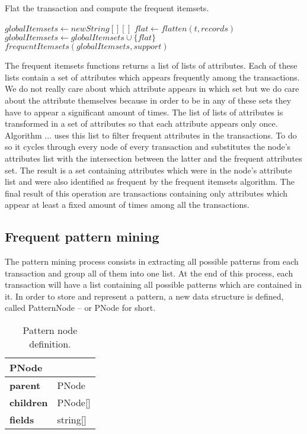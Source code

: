 \documentclass{acm_proc_article-sp-sigmod09}
\begin{document}
\begin{algorithm}
\caption{Flat the transaction and compute the frequent itemsets.}
\label{freqitemset}
\begin{algorithmic}[1]
\State $globalItemsets \gets new String[][]$
	\State $flat \gets flatten(t, records)$
	\State $globalItemsets \gets globalItemsets \cup \{flat\}$
\EndFor
\Return $frequentItemsets(globalItemsets, support)$
\EndFunction
\end{algorithmic}
\end{algorithm}

The frequent itemsets functions returns a list of lists of attributes. Each of these lists contain a set of attributes which appears frequently among the transactions. We do not really care about which attribute appears in which set but we do care about the attribute themselves because in order to be in any of these sets they have to appear a significant amount of times. The list of lists of attributes is transformed in a set of attributes so that each attribute appears only once. Algorithm ... uses this list to filter frequent attributes in the transactions. To do so it cycles through every node of every transaction and substitutes the node's attributes list with the intersection between the latter and the frequent attributes set. The result is a set containing attributes which were in the node's attribute list and were also identified as frequent by the frequent itemsets algorithm. The final result of this operation are transactions containing only attributes which appear at least a fixed amount of times among all the transactions.

\subsection{Frequent pattern mining}
\label{sec:patternmining}

The pattern mining process consists in extracting all possible patterns from each transaction and group all of them into one list. At the end of this process, each transaction will have a list containing all possible patterns which are contained in it. In order to store and represent a pattern, a new data structure is defined, called PatternNode -- or PNode for short.

\begin{table}[H]
\centering
\begin{tabular}{|ll|} \hline
\textbf{PNode} & \\ \hline
\textbf{parent} & PNode \\ \hline
\textbf{children} & PNode[] \\ \hline
\textbf{fields} & string[] \\
\hline\end{tabular}
\caption{Pattern node definition.}
\label{tab:tree}
\end{table}
\end{document}
